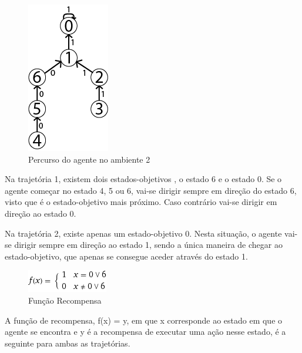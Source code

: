 \documentclass[11pt,twocolumn]{article}
\begin{document}
    \begin{figure}[htbp]
    \begin{center}
        \includegraphics[scale=0.5]{Trajetoria2.png}
        \caption{Percurso do agente no ambiente 2}
    \end{center}
    \end{figure}
    
    Na trajetória 1, existem dois estados-objetivos , o estado 6 e o estado 0. Se o agente começar no estado 4, 5 ou 6, vai-se dirigir
    sempre em direção do estado 6, visto que é o estado-objetivo mais próximo. Caso contrário vai-se dirigir em direção ao estado 0.\par
    
    Na trajetória 2, existe apenas um estado-objetivo 0. Nesta situação, o agente vai-se dirigir sempre em direção ao estado 1,
    sendo a única maneira de chegar ao estado-objetivo, que apenas se consegue aceder através do estado 1.\vspace{5mm}

    \begin{figure}[htbp]
        \begin{center}
            \includegraphics[scale=0.8]{piece1.png}
            \caption{Função Recompensa}
        \end{center}
        \end{figure}
    
    
    A função de recompensa, f(x) = y, em que x corresponde ao estado em que o agente se encontra e y é a recompensa de executar uma ação nesse estado,
    é a seguinte para ambas as trajetórias.
\end{document}
